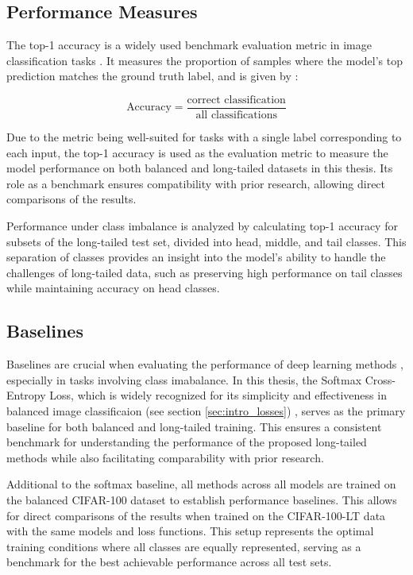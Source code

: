\subsection{Performance Measures}
The top-1 accuracy is a widely used benchmark evaluation metric in image classification tasks \cite{zhang2023deep}. It measures the proportion of samples where the model's top prediction matches the ground truth label, and is given by \cite{metrics}:

\begin{equation}
    \text{Accuracy} = \frac{\text{correct classification}}{\text{all classifications}}
\end{equation}


Due to the metric being well-suited for tasks with a single label corresponding to each input, the top-1 accuracy is used as the evaluation metric to measure the model performance on both balanced and long-tailed datasets in this thesis. Its role as a benchmark ensures compatibility with prior research, allowing direct comparisons of the results.

Performance under class imbalance is analyzed by calculating top-1 accuracy for subsets of the long-tailed test set, divided into head, middle, and tail classes. This separation of classes provides an insight into the model's ability to handle the challenges of long-tailed data, such as preserving high performance on tail classes while maintaining accuracy on head classes.


\subsection{Baselines}
Baselines are crucial when evaluating the performance of deep learning methods , especially in tasks involving class imabalance. In this thesis, the Softmax Cross-Entropy Loss, which is widely recognized for its simplicity and effectiveness in balanced image classificaion (see section \ref{sec:intro_losses}) , serves as the primary baseline for both balanced and long-tailed training. This ensures a consistent benchmark for understanding the performance of the proposed long-tailed methods while also facilitating comparability with prior research.

Additional to the softmax baseline, all methods across all models are trained on the balanced CIFAR-100 dataset to establish performance baselines. This allows for direct comparisons of the results when trained on the CIFAR-100-LT data with the same models and loss functions. This setup represents the optimal training conditions where all classes are equally represented, serving as a benchmark for the best achievable performance across all test sets.


